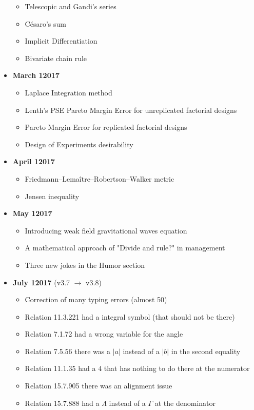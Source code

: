 \begin{itemize}
\begin{itemize}[noitemsep]
			\item Telescopic and Gandi's series
			\item Césaro's sum
			\item Implicit Differentiation
			\item Bivariate chain rule
		\end{itemize}
	\item \textbf{March 12017}
		\begin{itemize}[noitemsep]
			\item Laplace Integration method
			\item Lenth's PSE Pareto Margin Error for unreplicated factorial designs
			\item Pareto Margin Error for replicated factorial designs
			\item Design of Experiments desirability
		\end{itemize}
	\item \textbf{April 12017}
		\begin{itemize}[noitemsep]
			\item Friedmann–Lemaître–Robertson–Walker metric
			\item Jensen inequality
		\end{itemize}
	\item \textbf{May 12017}
		\begin{itemize}[noitemsep]
			\item Introducing weak field gravitational waves equation
			\item A mathematical approach of "Divide and rule?" in management
			\item Three new jokes in the Humor section
		\end{itemize}
	\item \textbf{July 12017} (v3.7 $\rightarrow$ v3.8)
		\begin{itemize}[noitemsep]
			\item Correction of many typing errors (almost 50)
			\item Relation 11.3.221 had a integral symbol  (that should not be there)
			\item Relation 7.1.72 had a wrong variable for the angle
			\item Relation 7.5.56 there was a $|a|$ instead of a $|b|$ in the second equality
			\item Relation 11.1.35 had a $4$ that has nothing to do there at the numerator
			\item Relation 15.7.905 there was an alignment issue
			\item Relation 15.7.888 had a $\Lambda$ instead of a $\Gamma$ at the denominator

\end{itemize}
\end{itemize}
